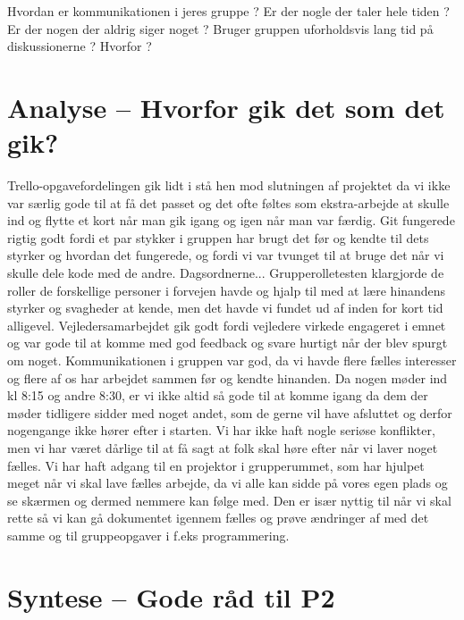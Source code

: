 \documentclass[oneside,a4paper,titlepage]{article}
\begin{document}
Hvordan er kommunikationen i jeres gruppe ? Er der nogle der taler hele tiden ? Er der nogen der aldrig siger noget ? Bruger gruppen uforholdsvis lang tid på diskussionerne ? Hvorfor ?


\section{Analyse – Hvorfor gik det som det gik?}
Trello-opgavefordelingen gik lidt i stå hen mod slutningen af projektet da vi ikke var særlig gode til at få det passet og det ofte føltes som ekstra-arbejde at skulle ind og flytte et kort når man gik igang og igen når man var færdig. 
Git fungerede rigtig godt fordi et par stykker i gruppen har brugt det før og kendte til dets styrker og hvordan det fungerede, og fordi vi var tvunget til at bruge det når vi skulle dele kode med de andre. 
Dagsordnerne...
Grupperolletesten klargjorde de roller de forskellige personer i forvejen havde og hjalp til med at lære hinandens styrker og svagheder at kende, men det havde vi fundet ud af inden for kort tid alligevel.
Vejledersamarbejdet gik godt fordi vejledere virkede engageret i emnet og var gode til at komme med god feedback og svare hurtigt når der blev spurgt om noget.
Kommunikationen i gruppen var god, da vi havde flere fælles interesser og flere af os har arbejdet sammen før og kendte hinanden.
Da nogen møder ind kl 8:15 og andre 8:30, er vi ikke altid så gode til at komme igang da dem der møder tidligere sidder med noget andet, som de gerne vil have afsluttet og derfor nogengange ikke hører efter i starten.
Vi har ikke haft nogle seriøse konflikter, men vi har været dårlige til at få sagt at folk skal høre efter når vi laver noget fælles.
Vi har haft adgang til en projektor i grupperummet, som har hjulpet meget når vi skal lave fælles arbejde, da vi alle kan sidde på vores egen plads og se skærmen og dermed nemmere kan følge med. Den er især nyttig til når vi skal rette så vi kan gå dokumentet igennem fælles og prøve ændringer af med det samme og til gruppeopgaver i f.eks programmering.


\section{Syntese – Gode råd til P2}
\end{document}
